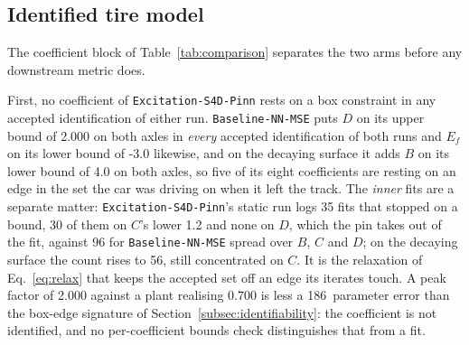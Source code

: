 \documentclass[lineno,12pt]{sn-jnl}
\makeatletter
\newif\ifsiu@prev
\DeclareRobustCommand{\siu@sep}{\ifsiu@prev\,\fi}
\DeclareRobustCommand{\siu@unit}[1]{\siu@sep\text{#1}\siu@prevtrue}
\DeclareRobustCommand{\siu@pre}[1]{\siu@sep\text{#1}\siu@prevfalse}
\DeclareRobustCommand{\siu@div}[1]{\text{#1}\siu@prevfalse}
\DeclareRobustCommand{\meter}{m}
\DeclareRobustCommand{\second}{s}
\DeclareRobustCommand{\gram}{g}
\DeclareRobustCommand{\newton}{N}
\DeclareRobustCommand{\radian}{rad}
\DeclareRobustCommand{\hertz}{Hz}
\DeclareRobustCommand{\percent}{\%}
\DeclareRobustCommand{\g}{\textit{g}}
\DeclareRobustCommand{\kilo}{k}
\DeclareRobustCommand{\milli}{m}
\DeclareRobustCommand{\per}{/}
\DeclareRobustCommand{\squared}{\ensuremath{^{2}}}
\providecommand{\degree}{\ensuremath{^{\circ}}}
\DeclareRobustCommand{\si}[1]{\begingroup
  \siu@prevfalse
  \renewcommand{\meter}{\siu@unit{m}}%
  \renewcommand{\second}{\siu@unit{s}}%
  \renewcommand{\gram}{\siu@unit{g}}%
  \renewcommand{\newton}{\siu@unit{N}}%
  \renewcommand{\radian}{\siu@unit{rad}}%
  \renewcommand{\hertz}{\siu@unit{Hz}}%
  \renewcommand{\percent}{\siu@unit{\%}}%
  \renewcommand{\degree}{\siu@unit{\ensuremath{^{\circ}}}}%
  \renewcommand{\g}{\siu@unit{\textit{g}}}%
  \renewcommand{\kilo}{\siu@pre{k}}%
  \renewcommand{\milli}{\siu@pre{m}}%
  \renewcommand{\per}{\siu@div{/}}%
  \renewcommand{\squared}{\ensuremath{^{2}}}%
  #1\endgroup}
\DeclareRobustCommand{\num}[1]{#1}
\DeclareRobustCommand{\SI}[2]{#1\,\si{#2}}
\newcommand{\oursarm}{\texttt{Excitation-\allowbreak S4D-\allowbreak Pinn}}
\newcommand{\basearm}{\texttt{Baseline-\allowbreak NN-\allowbreak MSE}}
\theoremstyle{thmstyleone}%
\theoremstyle{thmstyletwo}%
\theoremstyle{thmstylethree}%
\makeatother
\begin{document}
\subsection{Identified tire model}
\label{subsec:resultstire}

The coefficient block of Table~\ref{tab:comparison} separates the two arms
before any downstream metric does.

First, no coefficient of \oursarm{} rests on a box constraint in any accepted
identification of either run. \basearm{} puts $D$ on its upper bound of
\num{2.000} on both axles in \emph{every} accepted identification of both runs
and $E_{f}$ on its lower bound of \num{-3.0} likewise, and on the decaying
surface it adds $B$ on its lower bound of \num{4.0} on both axles, so five of
its eight coefficients are resting on an edge in the set the car was driving on
when it left the track. The \emph{inner} fits are a separate matter:
\oursarm{}'s static run logs \num{35} fits that stopped on a bound, \num{30} of
them on $C$'s lower \num{1.2} and none on $D$, which the pin takes out of the
fit, against \num{96} for \basearm{} spread over $B$, $C$ and $D$; on the
decaying surface the count rises to \num{56}, still concentrated on $C$. It is the
relaxation of Eq.~\eqref{eq:relax} that keeps the accepted set off an edge its
iterates touch. A peak factor of \num{2.000} against a plant realising
\num{0.700} is less a \SI{186}{\percent} parameter error than the box-edge
signature of Section~\ref{subsec:identifiability}: the coefficient is not
identified, and no per-coefficient bounds check distinguishes that from a fit.
\end{document}
